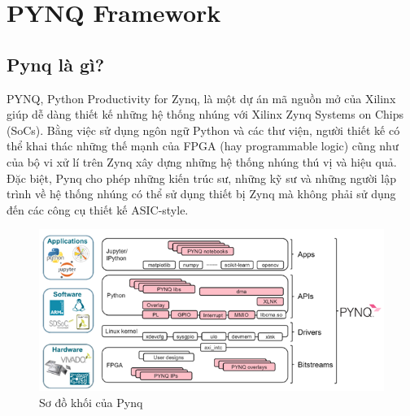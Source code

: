     \section{PYNQ Framework}
        \subsection{Pynq là gì?}
        PYNQ, Python Productivity for Zynq, là một dự án mã nguồn mở của Xilinx giúp dễ dàng thiết kế những hệ thống nhúng với Xilinx Zynq\cite{zynq} Systems on Chips (SoCs).
		Bằng việc sử dụng ngôn ngữ Python và các thư viện, người thiết kế có thể khai thác những thế mạnh của FPGA (hay programmable logic) cũng như của bộ vi xử lí trên Zynq xây dựng những hệ thống nhúng thú vị và hiệu quả. Đặc biệt, Pynq cho phép những kiến trúc sư, những kỹ sư và những người lập trình về hệ thống nhúng có thể sử dụng thiết bị Zynq mà không phải sử dụng đến các công cụ thiết kế ASIC-style.

		\begin{figure}[htp]
    		\centering
     		\includegraphics[scale=.7]{images/pynq.png}
    		\caption{Sơ đồ khối của Pynq}
    		\label{fig:pynqblockdiagram}
    	\end{figure}

